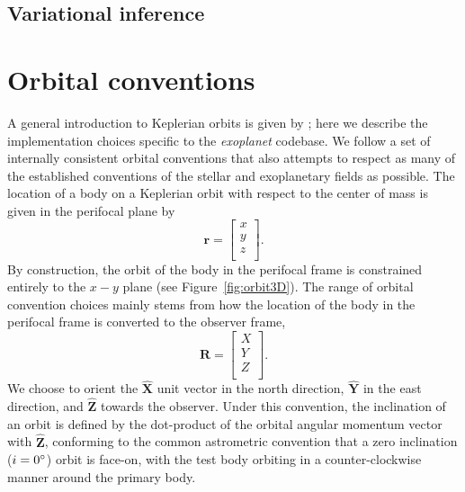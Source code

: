 \documentclass[modern]{aastex62}
\begin{document}



\subsection{Variational inference}

\section{Orbital conventions}
A general introduction to Keplerian orbits is given by \citet{Murray:2010}; here we describe the implementation choices specific to the \emph{exoplanet} codebase.
We follow a set of internally consistent orbital conventions that also attempts to respect as many of the established conventions of the stellar and exoplanetary fields as possible. The location of a body on a Keplerian orbit with respect to the center of mass is given in the perifocal plane by
\begin{equation}
  \boldsymbol{r} =
  \left [
    \begin{array}{c}
      x\\
      y\\
      z\\
    \end{array}
  \right ].
\end{equation}
By construction, the orbit of the body in the perifocal frame is constrained entirely to the $x -y$ plane (see Figure~\ref{fig:orbit3D}). The range of orbital convention choices mainly stems from how the location of the body in the perifocal frame is converted to the observer frame,
\begin{equation}
  \boldsymbol{R} =
  \left [
    \begin{array}{c}
      X\\
      Y\\
      Z\\
    \end{array}
  \right ].
\end{equation}
We choose to orient the $\hat{\boldsymbol{X}}$ unit vector in the north direction, $\hat{\boldsymbol{Y}}$ in the east direction, and $\hat{\boldsymbol{Z}}$ towards the observer. Under this convention, the inclination of an orbit is defined by the dot-product of the orbital angular momentum vector with $\hat{\boldsymbol{Z}}$, conforming to the common astrometric convention that a zero inclination ($i = 0\mbox{$^\circ$}$) orbit is face-on, with the test body orbiting in a counter-clockwise manner around the primary body.
\end{document}
